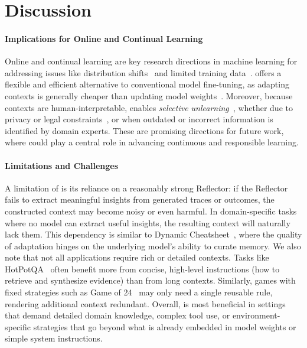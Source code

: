 \section{Discussion}
\label{sec:discussion}

\paragraph{Implications for Online and Continual Learning} 
Online and continual learning are key research directions in machine learning for addressing issues like distribution shifts~\citep{koh2021wilds,gulrajani2021domain} and limited training data~\citep{pan2010survey,hutchinson2017overcoming,zhuang2019transfer}.
\name offers a flexible and efficient alternative to conventional model fine-tuning, as adapting contexts is generally cheaper than updating model weights~\citep{brown2020gpt3,lester2021prompttuning,li2021prefixtuning,hu2021lora}.
Moreover, because contexts are human-interpretable, \name enables \textit{selective unlearning}~\citep{cao2015unlearning,bourtoule2021sisa,liu2024rethinkingllmunlearning}, whether due to privacy or legal constraints~\citep{gdpr2016art17,ccpa1798_105}, or when outdated or incorrect information is identified by domain experts.
These are promising directions for future work, where \name could play a central role in advancing continuous and responsible learning.

\paragraph{Limitations and Challenges}  
A limitation of \name is its reliance on a reasonably strong Reflector: if the Reflector fails to extract meaningful insights from generated traces or outcomes, the constructed context may become noisy or even harmful.  
In domain-specific tasks where no model can extract useful insights, the resulting context will naturally lack them. This dependency is similar to Dynamic Cheatsheet~\citep{suzgun2025dynamic}, where the quality of adaptation hinges on the underlying model’s ability to curate memory.  
We also note that not all applications require rich or detailed contexts.  
Tasks like HotPotQA~\citep{yang2018hotpotqa} often benefit more from concise, high-level instructions (\eg how to retrieve and synthesize evidence) than from long contexts.  
Similarly, games with fixed strategies such as Game of 24~\citep{suzgun2025dynamic} may only need a single reusable rule, rendering additional context redundant.  
Overall, \name is most beneficial in settings that demand detailed domain knowledge, complex tool use, or environment-specific strategies that go beyond what is already embedded in model weights or simple system instructions.
